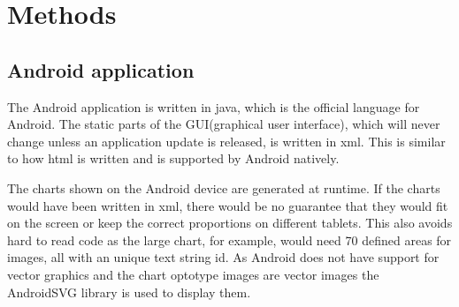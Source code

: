 \documentclass[12pt,a4paper,notitlepage]{report}
\begin{document}

\section{Methods}






\subsection{Android application}
The Android application is written in java, which is the official language for Android. The static parts of the GUI(graphical user interface), which will never change unless an application update is released, is written in xml. This is similar to how html is written and is supported by Android natively.

The charts shown on the Android device are generated at runtime. If the charts would have been written in xml, there would be no guarantee that they would fit on the screen or keep the correct proportions on different tablets. This also avoids hard to read code as the large chart, for example, would need 70 defined areas for images, all with an unique text string id. As Android does not have support for vector graphics and the chart optotype images are vector images the AndroidSVG \cite{AndroidSVG} library is used to display them.
\end{document}
